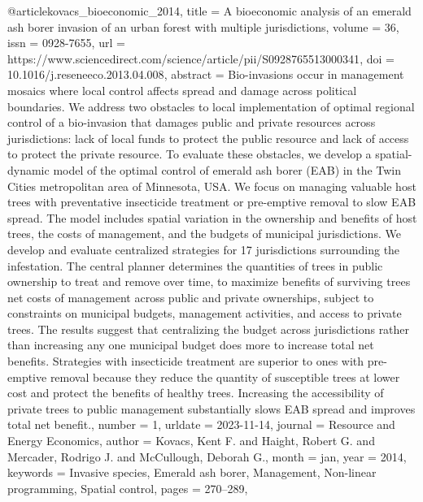 {{@article{kovacs_bioeconomic_2014,
	title = {A bioeconomic analysis of an emerald ash borer invasion of an urban forest with multiple jurisdictions},
	volume = {36},
	issn = {0928-7655},
	url = {https://www.sciencedirect.com/science/article/pii/S0928765513000341},
	doi = {10.1016/j.reseneeco.2013.04.008},
	abstract = {Bio-invasions occur in management mosaics where local control affects spread and damage across political boundaries. We address two obstacles to local implementation of optimal regional control of a bio-invasion that damages public and private resources across jurisdictions: lack of local funds to protect the public resource and lack of access to protect the private resource. To evaluate these obstacles, we develop a spatial-dynamic model of the optimal control of emerald ash borer (EAB) in the Twin Cities metropolitan area of Minnesota, USA. We focus on managing valuable host trees with preventative insecticide treatment or pre-emptive removal to slow EAB spread. The model includes spatial variation in the ownership and benefits of host trees, the costs of management, and the budgets of municipal jurisdictions. We develop and evaluate centralized strategies for 17 jurisdictions surrounding the infestation. The central planner determines the quantities of trees in public ownership to treat and remove over time, to maximize benefits of surviving trees net costs of management across public and private ownerships, subject to constraints on municipal budgets, management activities, and access to private trees. The results suggest that centralizing the budget across jurisdictions rather than increasing any one municipal budget does more to increase total net benefits. Strategies with insecticide treatment are superior to ones with pre-emptive removal because they reduce the quantity of susceptible trees at lower cost and protect the benefits of healthy trees. Increasing the accessibility of private trees to public management substantially slows EAB spread and improves total net benefit.},
	number = {1},
	urldate = {2023-11-14},
	journal = {Resource and Energy Economics},
	author = {Kovacs, Kent F. and Haight, Robert G. and Mercader, Rodrigo J. and McCullough, Deborah G.},
	month = jan,
	year = {2014},
	keywords = {Invasive species, Emerald ash borer, Management, Non-linear programming, Spatial control},
	pages = {270--289},
}

}}
